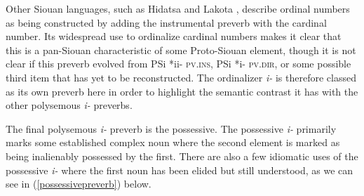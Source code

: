 Other Siouan languages, such as Hidatsa \citep{park2012} and Lakota \citep{ullrich2011}, describe ordinal numbers as being constructed by adding the instrumental preverb with the cardinal number. Its widespread use to ordinalize cardinal numbers makes it clear that this is a pan-Siouan characteristic of some Proto-Siouan element, though it is not clear if this preverb evolved from PSi *ii- \textsc{pv.ins}, PSi *i- \textsc{pv.dir}, or some possible third item that has yet to be reconstructed. The ordinalizer \textit{i-} is therefore classed as its own preverb here in order to highlight the semantic contrast it has with the other polysemous \textit{i-} preverbs. 

\label{SubParaPossessive}

The final polysemous \textit{i-} preverb is the possessive. The possessive \textit{i-} primarily marks some established complex noun where the second element is marked as being inalienably possessed by the first. There are also a few idiomatic uses of the possessive \textit{i-} where the first noun has been elided but still understood, as we can see in (\ref{possessivepreverb}) below.

